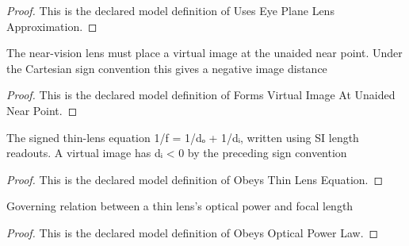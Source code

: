 \begin{proof}
  This is the declared model definition of Uses Eye Plane Lens Approximation.
\end{proof}
\begin{definition}
  \label{def:physics:phyx-mini-0029:phyxminiproblems-problemphyxmini0029-formsvirtualimageatunaidednearpoint}
  The near-vision lens must place a virtual image at the unaided near point. Under the Cartesian sign convention this gives a negative image distance
\end{definition}
\begin{proof}
  This is the declared model definition of Forms Virtual Image At Unaided Near Point.
\end{proof}
\begin{definition}
  \label{def:physics:phyx-mini-0029:phyxminiproblems-problemphyxmini0029-obeysthinlensequation}
  The signed thin-lens equation 1/f = 1/dₒ + 1/dᵢ, written using SI length readouts. A virtual image has dᵢ < 0 by the preceding sign convention
\end{definition}
\begin{proof}
  This is the declared model definition of Obeys Thin Lens Equation.
\end{proof}
\begin{definition}
  \label{def:physics:phyx-mini-0029:phyxminiproblems-problemphyxmini0029-obeysopticalpowerlaw}
  Governing relation between a thin lens's optical power and focal length
\end{definition}
\begin{proof}
  This is the declared model definition of Obeys Optical Power Law.
\end{proof}
